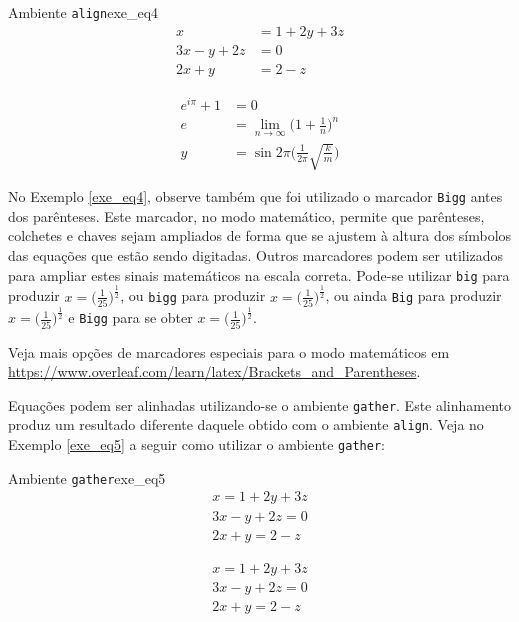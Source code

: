 \begin{texexptitled}[breakable,center lower,enhanced,middle=2mm]{Ambiente {\tt align}}{exe_eq4}
\begin{align*}
 x           & = 1 + 2y + 3z \\ 
3x -  y + 2z & = 0           \\
2x +  y      & = 2 - z
\end{align*}

\begin{align}
e^{i\pi} + 1 & = 0                                           \\
e & = \lim_{n \to \infty}{\Bigg(1 + \frac{1}{n}\Bigg)^{n}}   \\
y & = \sin 2\pi \Bigg(\frac{1}{2\pi}\sqrt{\frac{k}{m}}\Bigg)
\end{align}
\end{texexptitled}

No Exemplo \ref{exe_eq4}, observe também que foi utilizado o marcador {\tt Bigg} antes dos parênteses. Este marcador, no modo matemático, permite que parênteses, colchetes e chaves sejam ampliados de forma que se ajustem à altura dos símbolos das equações que estão sendo digitadas. Outros marcadores podem ser utilizados para ampliar estes sinais matemáticos na escala correta. Pode-se utilizar {\tt big} para produzir $x=\big(\frac{1}{25}\big)^{\frac{1}{2}}$, ou {\tt bigg} para produzir $x=\bigg(\frac{1}{25}\bigg)^{\frac{1}{2}}$, ou ainda {\tt Big} para produzir $x=\Big(\frac{1}{25}\Big)^{\frac{1}{2}}$ e {\tt Bigg} para se obter $x=\Bigg(\frac{1}{25}\Bigg)^{\frac{1}{2}}$.

\begin{marker}
Veja mais opções de marcadores especiais para o modo matemáticos em \url{https://www.overleaf.com/learn/latex/Brackets_and_Parentheses}.
\end{marker}

Equações podem ser alinhadas utilizando-se o ambiente {\tt gather}. Este alinhamento produz um resultado diferente daquele obtido com o ambiente {\tt align}. Veja no Exemplo \ref{exe_eq5} a seguir como utilizar o ambiente {\tt gather}:

\begin{texexptitled}[breakable,center lower,enhanced,middle=2mm]{Ambiente {\tt gather}}{exe_eq5}
\begin{gather*}
 x           = 1 + 2y + 3z \\ 
3x -  y + 2z = 0           \\
2x +  y      = 2 - z
\end{gather*}

\begin{gather}
 x           = 1 + 2y + 3z \\ 
3x -  y + 2z = 0           \\
2x +  y      = 2 - z
\end{gather}
\end{texexptitled}

